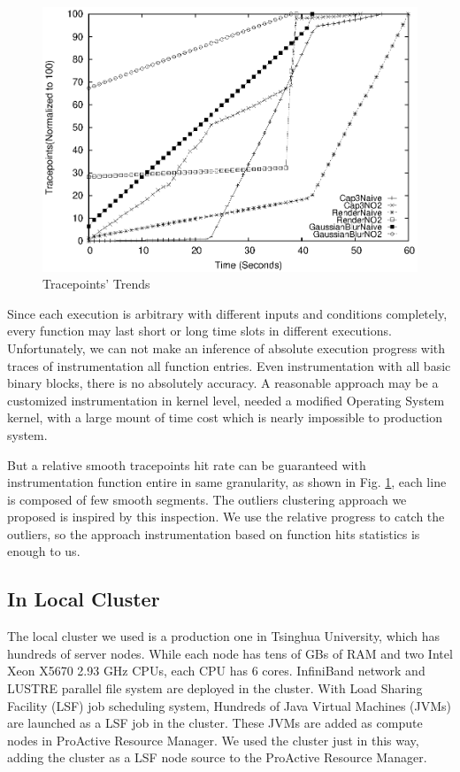 \begin{figure}
\centering
\includegraphics[width=0.9\columnwidth]{figures/tracepoints_all_vs_sampling.eps}
\caption{Tracepoints' Trends}
\label{figure:tracepoints}
\end{figure}

Since each execution is arbitrary with different inputs and conditions completely, every function may last short or long time slots in different executions. Unfortunately, we can not make an inference of absolute execution progress with traces of instrumentation all function entries. Even instrumentation with all basic binary blocks, there is no absolutely accuracy. A reasonable approach may be a customized instrumentation in kernel level, needed a modified Operating System kernel, with a large mount of time cost which is nearly impossible to production system.

But a relative smooth tracepoints hit rate can be guaranteed with instrumentation function entire in same granularity, as shown in Fig. \ref{figure:tracepoints}, each line is composed of few smooth segments. The outliers clustering approach we proposed is inspired by this inspection. We use the relative progress to catch the outliers, so the approach instrumentation based on function hits statistics is enough to us.

\subsection{In Local Cluster}

The local cluster we used is a production one in Tsinghua University, which has hundreds of  server nodes. While each node has tens of GBs of RAM and two Intel Xeon X5670 2.93 GHz CPUs, each CPU has 6 cores. InfiniBand network and LUSTRE parallel file system are deployed in the cluster. With Load Sharing Facility (LSF) job scheduling system, Hundreds of Java Virtual Machines (JVMs) are launched as a LSF job in the cluster. These JVMs are added as compute nodes in ProActive Resource Manager. We used the cluster just in this way, adding the cluster as a LSF node source to the ProActive Resource Manager.

